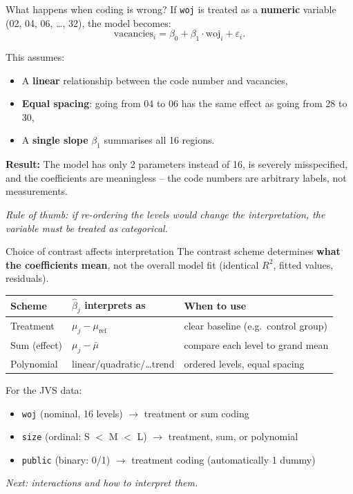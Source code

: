 \documentclass[10pt,ignorenonframetext,aspectratio=169]{beamer}
\begin{document}
\begin{frame}{What happens when coding is wrong?}
If \texttt{woj} is treated as a \textbf{numeric} variable (02, 04, 06, \ldots, 32),
the model becomes:
\begin{equation}
    \text{vacancies}_i = \beta_0 + \beta_1 \cdot \text{woj}_i + \varepsilon_i.
\end{equation}

This assumes:
\begin{itemize}
    \item A \textbf{linear} relationship between the code number and vacancies,
    \item \textbf{Equal spacing}: going from 04 to 06 has the same effect as
          going from 28 to 30,
    \item A \textbf{single slope} $\beta_1$ summarises all 16 regions.
\end{itemize}

\medskip
\textbf{Result:} The model has only 2 parameters instead of 16, is severely
misspecified, and the coefficients are meaningless -- the code numbers are
arbitrary labels, not measurements.

\medskip
\textit{Rule of thumb: if re-ordering the levels would change the interpretation,
the variable must be treated as categorical.}
\end{frame}


\begin{frame}{Choice of contrast affects interpretation}
The contrast scheme determines \textbf{what the coefficients mean},
not the overall model fit (identical $R^2$, fitted values, residuals).

\medskip
\begin{table}[ht]
\centering
\small
\begin{tabular}{lll}
  \hline
  \textbf{Scheme} & \textbf{$\hat{\beta}_j$ interprets as} & \textbf{When to use} \\
  \hline
  Treatment & $\mu_j - \mu_{\text{ref}}$ & clear baseline (e.g.\ control group) \\
  Sum (effect) & $\mu_j - \bar{\mu}$ & compare each level to grand mean \\
  Polynomial & linear/quadratic/\ldots trend & ordered levels, equal spacing \\
  \hline
\end{tabular}
\end{table}

\medskip
For the JVS data:
\begin{itemize}
    \item \texttt{woj} (nominal, 16 levels) $\rightarrow$ treatment or sum coding
    \item \texttt{size} (ordinal: S $<$ M $<$ L) $\rightarrow$ treatment, sum, or polynomial
    \item \texttt{public} (binary: 0/1) $\rightarrow$ treatment coding (automatically 1 dummy)
\end{itemize}

\medskip
\textit{Next: interactions and how to interpret them.}
\end{frame}
\end{document}
